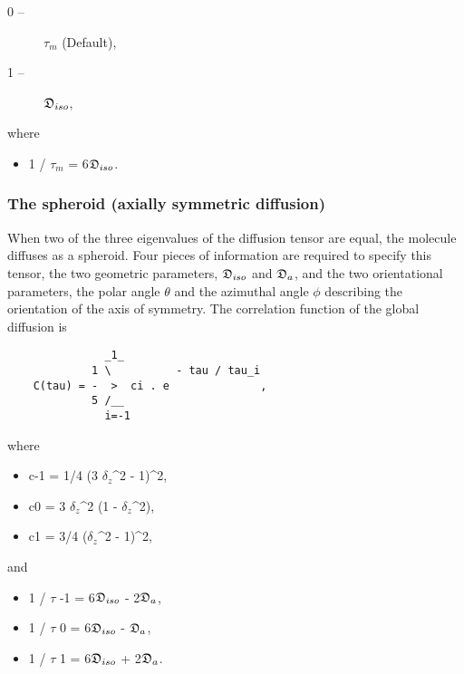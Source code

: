 \begin{description}
\item[0 --]  $\tau_m$   (Default), 
\item[1 --]  $\mathfrak{D}_{iso}$, 
\end{description}


where


\begin{itemize}
\item[] 1 / $\tau_m$ = 6$\mathfrak{D}_{iso}$. 
\end{itemize}



\subsubsection{The spheroid (axially symmetric diffusion)}

When two of the three eigenvalues of the diffusion tensor are equal, the molecule diffuses as a spheroid.  Four pieces of information are required to specify this tensor, the two geometric parameters, $\mathfrak{D}_{iso}$ and $\mathfrak{D}_a$, and the two orientational parameters, the polar angle $\theta$ and the azimuthal angle $\phi$ describing the orientation of the axis of symmetry.  The correlation function of the global diffusion is


{\footnotesize \begin{verbatim}
               _1_
             1 \          - tau / tau_i
    C(tau) = -  >  ci . e              ,
             5 /__
               i=-1
\end{verbatim}}

where


\begin{itemize}
\item[] c-1 = 1/4 (3 $\delta_z$\^{}2 - 1)\^{}2, 
\item[] c0  = 3 $\delta_z$\^{}2 (1 - $\delta_z$\^{}2), 
\item[] c1  = 3/4 ($\delta_z$\^{}2 - 1)\^{}2, 
\end{itemize}


and


\begin{itemize}
\item[] 1 / $\tau$ -1 = 6$\mathfrak{D}_{iso}$ - 2$\mathfrak{D}_a$, 
\item[] 1 / $\tau$ 0  = 6$\mathfrak{D}_{iso}$ - $\mathfrak{D}_a$, 
\item[] 1 / $\tau$ 1  = 6$\mathfrak{D}_{iso}$ + 2$\mathfrak{D}_a$. 
\end{itemize}


